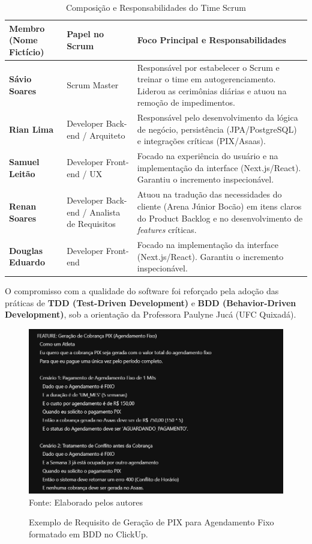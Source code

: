 \documentclass[a4paper, 12pt, twoside]{article}
\begin{document}
\begin{table}[htb]
    \caption{Composição e Responsabilidades do Time Scrum}
    \label{tab:composicao_time}
    \centering
    \footnotesize
    \begin{tabular}{|p{3cm}|p{3.5cm}|p{7cm}|}
        \toprule
        \textbf{Membro (Nome Fictício)} & \textbf{Papel no Scrum} & \textbf{Foco Principal e Responsabilidades} \\
        \midrule
        \textbf{Sávio Soares} & Scrum Master & Responsável por estabelecer o Scrum e treinar o time em autogerenciamento. Liderou as cerimônias diárias e atuou na remoção de impedimentos. \\
        \hline
        \textbf{Rian Lima} & Developer Back-end / Arquiteto & Responsável pelo desenvolvimento da lógica de negócio, persistência (JPA/PostgreSQL) e integrações críticas (PIX/Asaas). \\
        \hline
        \textbf{Samuel Leitão} & Developer Front-end / UX & Focado na experiência do usuário e na implementação da interface (Next.js/React). Garantiu o incremento inspecionável. \\
        \hline
        \textbf{Renan Soares} & Developer Back-end / Analista de Requisitos & Atuou na tradução das necessidades do cliente (Arena Júnior Bocão) em itens claros do Product Backlog e no desenvolvimento de \textit{features} críticas. \\
        \midrule
        \textbf{Douglas Eduardo} & Developer Front-end & Focado na implementação da interface (Next.js/React). Garantiu o incremento inspecionável. \\
        \bottomrule
    \end{tabular}
\end{table}

O compromisso com a qualidade do software foi reforçado pela adoção das práticas de \textbf{TDD (Test-Driven Development)} e \textbf{BDD (Behavior-Driven Development)}, sob a orientação da Professora Paulyne Jucá (UFC Quixadá).

\begin{figure}[!htb]
\caption{Exemplo de Requisito de Geração de PIX para Agendamento Fixo formatado em BDD no ClickUp.}
\label{fig:bdd_card}
\centering
\includegraphics[width=1.0\textwidth]{figs/BDD_Pagamento_PIX_AG_FIXO.png}
{\footnotesize Fonte: Elaborado pelos autores}
\end{figure}
\end{document}
